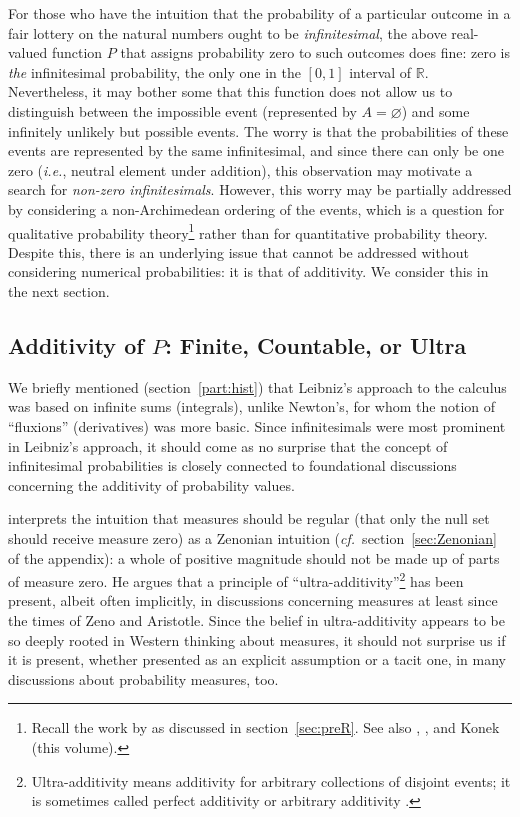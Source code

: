 For those who have the intuition that the probability of a particular outcome in a fair lottery on the natural numbers ought to be \emph{infinitesimal}, the above real-valued function $P$ that assigns probability zero to such outcomes does fine: zero is \emph{the} infinitesimal probability, the only one in the $[0,1]$ interval of $\mathbb{R}$.
Nevertheless, it may bother some that this function does not allow us to distinguish between the impossible event (represented by $A=\varnothing$) and some infinitely unlikely but possible events. The worry is that the probabilities of these events are represented by the same infinitesimal, and since there can only be one zero (\textit{i.e.}, neutral element under addition), this observation may motivate a search for \emph{non-zero infinitesimals}. However, this worry may be partially addressed by considering a non-Archimedean ordering of the events, which is a question for qualitative probability theory\footnote{Recall the work by \citet{deFinetti:1931} as discussed in section~\ref{sec:preR}. See also \citet{Pedersen:2014a}, \citet[p.~17]{Easwaran:2014}, and Konek (this volume).} rather than for quantitative probability theory.
Despite this, there is an underlying issue that cannot be addressed without considering numerical probabilities: it is that of additivity. We consider this in the next section.

\subsection{Additivity of $P$: Finite, Countable, or Ultra}\label{sec:AdditivityOfP}
We briefly mentioned (section~\ref{part:hist}) that Leibniz's approach to the calculus was based on infinite sums (integrals), unlike Newton's, for whom the notion of ``fluxions'' (derivatives) was more basic. Since infinitesimals were most prominent in Leibniz's approach, it should come as no surprise that the concept of infinitesimal probabilities is closely connected to foundational discussions concerning the additivity of probability values.

\citet{Skyrms:1983a} interprets the intuition that measures should be regular (that only the null set should receive measure zero) as a Zenonian intuition (\textit{cf.}\ section~\ref{sec:Zenonian} of the appendix): a whole of positive magnitude should not be made up of parts of measure zero.
He argues that a principle of ``ultra-additivity''\footnote{Ultra-additivity means additivity for arbitrary collections of disjoint events; it is sometimes called perfect additivity \citep[see, \textit{e.g.},][Vol.~II, p.~118]{deFinetti:1974} or arbitrary additivity \citep{Hofweber:2014}.} has been present, albeit often implicitly, in discussions concerning measures at least since the times of Zeno and Aristotle. Since the belief in ultra-additivity appears to be so deeply rooted in Western thinking about measures, it should not surprise us if it is present, whether presented as an explicit assumption or a tacit one, in many discussions about probability measures, too.

